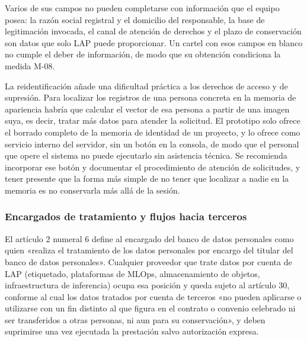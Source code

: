 Varios de sus campos no pueden completarse con información que el equipo
posea: la razón social registral y el domicilio del responsable, la base
de legitimación invocada, el canal de atención de derechos y el plazo de
conservación son datos que solo LAP puede proporcionar. Un cartel con
esos campos en blanco no cumple el deber de información, de modo que su
obtención condiciona la medida M-08.

La reidentificación añade una dificultad práctica a los derechos de acceso y de
supresión. Para localizar los registros de una persona concreta en la memoria
de apariencia habría que calcular el vector de esa persona a partir de una
imagen suya, es decir, tratar más datos para atender la solicitud. El prototipo
solo ofrece el borrado completo de la memoria de identidad de un proyecto, y lo
ofrece como servicio interno del servidor, sin un botón en la consola, de modo
que el personal que opere el sistema no puede ejecutarlo sin asistencia
técnica. Se recomienda incorporar ese botón y documentar el procedimiento de
atención de solicitudes, y tener presente que la forma más simple de no tener
que localizar a nadie en la memoria es no conservarla más allá de la sesión.

\subsubsection{Encargados de tratamiento y flujos hacia terceros}

El artículo 2 numeral 6 define al encargado del banco de datos
personales como quien «realiza el tratamiento de los datos personales
por encargo del titular del banco de datos personales». Cualquier
proveedor que trate datos por cuenta de LAP (etiquetado, plataformas de
MLOps, almacenamiento de objetos, infraestructura de inferencia) ocupa
esa posición y queda sujeto al artículo 30, conforme al cual los datos
tratados por cuenta de terceros «no pueden aplicarse o utilizarse con un
fin distinto al que figura en el contrato o convenio celebrado ni ser
transferidos a otras personas, ni aun para su conservación», y deben
suprimirse una vez ejecutada la prestación salvo autorización expresa.


